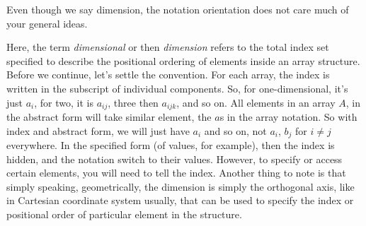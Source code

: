 Even though we say dimension, the notation orientation does not care much of your general ideas. 

Here, the term \textit{dimensional} or then \textit{dimension} refers to the total index set specified to describe the positional ordering of elements inside an array structure. Before we continue, let's settle the convention. For each array, the index is written in the subscript of individual components. So, for one-dimensional, it's just $a_i$, for two, it is $a_{ij}$, three then $a_{ijk}$, and so on. All elements in an array $A$, in the abstract form will take similar element, the $a$s in the array notation. So with index and abstract form, we will just have $a_{i}$ and so on, not $a_i$, $b_{j}$ for $i\neq j$ everywhere. In the specified form (of values, for example), then the index is hidden, and the notation switch to their values. However, to specify or access certain elements, you will need to tell the index. Another thing to note is that simply speaking, geometrically, the dimension is simply the orthogonal axis, like in Cartesian coordinate system usually, that can be used to specify the index or positional order of particular element in the structure. 

